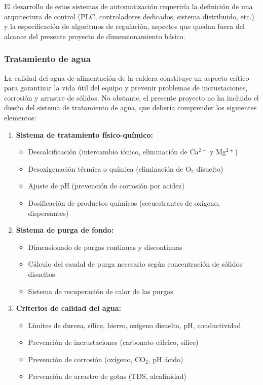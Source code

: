 El desarrollo de estos sistemas de automatización requeriría la definición de una arquitectura de control (PLC, controladores dedicados, sistema distribuido, etc.) y la especificación de algoritmos de regulación, aspectos que quedan fuera del alcance del presente proyecto de dimensionamiento básico.

\subsubsection{Tratamiento de agua}
\label{subsubsec:limitaciones-tratamiento-agua}

La calidad del agua de alimentación de la caldera constituye un aspecto crítico para garantizar la vida útil del equipo y prevenir problemas de incrustaciones, corrosión y arrastre de sólidos. No obstante, el presente proyecto no ha incluido el diseño del sistema de tratamiento de agua, que debería comprender los siguientes elementos:

\begin{enumerate}[label=\arabic*., leftmargin=2em]
	\item \textbf{Sistema de tratamiento físico-químico:}
	      \begin{itemize}[noitemsep]
		      \item Descalcificación (intercambio iónico, eliminación de Ca$^{2+}$ y Mg$^{2+}$)
		      \item Desoxigenación térmica o química (eliminación de O$_2$ disuelto)
		      \item Ajuste de pH (prevención de corrosión por acidez)
		      \item Dosificación de productos químicos (secuestrantes de oxígeno, dispersantes)
	      \end{itemize}

	\item \textbf{Sistema de purga de fondo:}
	      \begin{itemize}[noitemsep]
		      \item Dimensionado de purgas continuas y discontinuas
		      \item Cálculo del caudal de purga necesario según concentración de sólidos disueltos
		      \item Sistema de recuperación de calor de las purgas
	      \end{itemize}

	\item \textbf{Criterios de calidad del agua:}
	      \begin{itemize}[noitemsep]
		      \item Límites de dureza, sílice, hierro, oxígeno disuelto, pH, conductividad
		      \item Prevención de incrustaciones (carbonato cálcico, sílice)
		      \item Prevención de corrosión (oxígeno, CO$_2$, pH ácido)
		      \item Prevención de arrastre de gotas (TDS, alcalinidad)
	      \end{itemize}
\end{enumerate}

